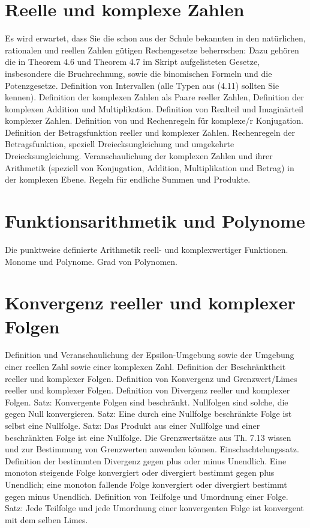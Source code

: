 \documentclass[10pt,a4paper,twoside]{article}
\begin{document}
\section{Reelle und komplexe Zahlen}
 
Es wird erwartet, dass Sie die schon aus der Schule bekannten in den natürlichen, rationalen und reellen Zahlen gütigen Rechengesetze beherrschen: Dazu gehören die in Theorem 4.6 und Theorem 4.7 im Skript aufgelisteten Gesetze, insbesondere die Bruchrechnung, sowie die binomischen Formeln und die Potenzgesetze. Definition von Intervallen (alle Typen aus (4.11) sollten Sie kennen). Definition der komplexen Zahlen als Paare reeller Zahlen, Definition der komplexen Addition und Multiplikation. Definition von Realteil und Imaginärteil komplexer Zahlen. Definition von und Rechenregeln für komplexe/r Konjugation. Definition der Betragsfunktion reeller und komplexer Zahlen. Rechenregeln der Betragsfunktion, speziell Dreiecksungleichung und umgekehrte Dreiecksungleichung. Veranschaulichung der komplexen Zahlen und ihrer Arithmetik (speziell von Konjugation, Addition, Multiplikation und Betrag) in der komplexen Ebene. Regeln für endliche Summen und Produkte. 

\section{Funktionsarithmetik und Polynome}
 
Die punktweise definierte Arithmetik reell- und komplexwertiger Funktionen. Monome und Polynome. Grad von Polynomen. 

\section{Konvergenz reeller und komplexer Folgen}
 
Definition und Veranschaulichung der Epsilon-Umgebung sowie der Umgebung einer reellen Zahl sowie einer komplexen Zahl. Definition der Beschränktheit reeller und komplexer Folgen. Definition von Konvergenz und Grenzwert/Limes reeller und komplexer Folgen. Definition von Divergenz reeller und komplexer Folgen. Satz: Konvergente Folgen sind beschränkt. Nullfolgen sind solche, die gegen Null konvergieren. Satz: Eine durch eine Nullfolge beschränkte Folge ist selbst eine Nullfolge. Satz: Das Produkt aus einer Nullfolge und einer beschränkten Folge ist eine Nullfolge. Die Grenzwertsätze aus Th. 7.13 wissen und zur Bestimmung von Grenzwerten anwenden können. Einschachtelungssatz. Definition der bestimmten Divergenz gegen plus oder minus Unendlich. Eine monoton steigende Folge konvergiert oder divergiert bestimmt gegen plus Unendlich; eine monoton fallende Folge konvergiert oder divergiert bestimmt gegen minus Unendlich. Definition von Teilfolge und Umordnung einer Folge. Satz: Jede Teilfolge und jede Umordnung einer konvergenten Folge ist konvergent mit dem selben Limes. 
\end{document}
